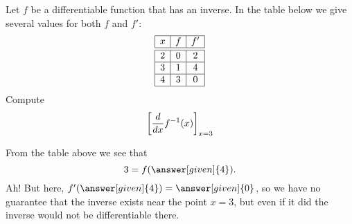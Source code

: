 \documentclass{ximera}
\begin{document}
\begin{example}
  Let $f$ be a differentiable function that has an inverse. In the
  table below we give several values for both $f$ and $f'$:
  \[
  \begin{array}{|c|c|c|}\hline
    x & f  & f' \\ \hline \hline
    2 & 0  & 2  \\ \hline
    3 & 1  & 4 \\ \hline
    4 & 3 & 0  \\ \hline
  \end{array}
  \]
  Compute
  \[
  \bigg[ \frac{d}{\mathop{}\!d x} f^{-1}(x) \bigg]_{x=3}
  \]
  \begin{explanation}
    From the table above we see that
    \[
    3 = f(\answer[given]{4}).
    \]
    Ah! But here, $f'(\answer[given]{4}) = \answer[given]{0}$, so we have no guarantee that the
    inverse exists near the point $x=3$, but even if it did the inverse would not be differentiable there.
      \end{explanation}
\end{example}
\end{document}
